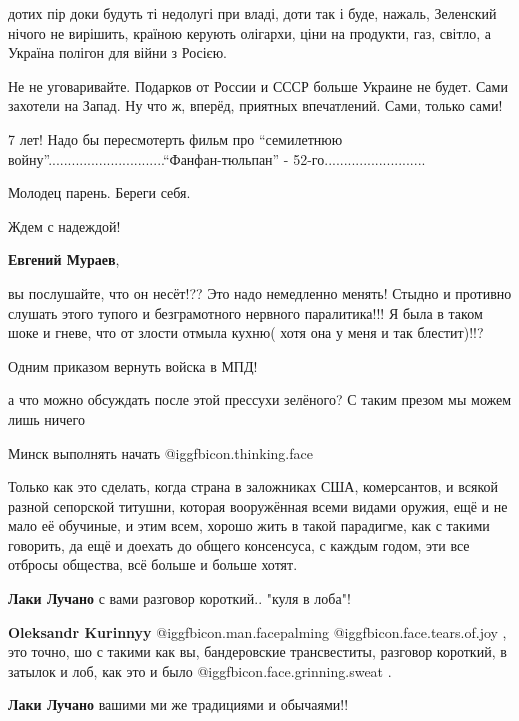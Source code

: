 \begin{itemize}
дотих пір доки будуть ті недолугі при владі, доти так і буде, нажаль, Зеленский
нічого не вирішить, країною керують олігархи, ціни на продукти, газ, світло, а
Україна полігон для війни з Росією.


Не не уговаривайте. Подарков от России и СССР больше Украине не будет. Сами
захотели на Запад. Ну что ж, вперёд, приятных впечатлений. Сами, только сами!


7 лет! Надо бы пересмотерть фильм про \enquote{семилетнюю
войну}..............................\enquote{Фанфан-тюльпан} -
52-го..........................

Молодец парень. Береги себя.

Ждем с надеждой!

\textbf{Евгений Мураев}, 

вы послушайте, что он несёт!?? Это надо немедленно менять! Стыдно и противно
слушать этого тупого и безграмотного нервного паралитика!!! Я была в таком шоке
и гневе, что от злости отмыла кухню( хотя она у меня и так блестит)!!?

Одним приказом вернуть войска в МПД!

а что можно обсуждать после этой прессухи зелёного? С таким презом мы можем лишь ничего

Минск выполнять начать @igg{fbicon.thinking.face} 


Только как это сделать, когда страна в заложниках США, комерсантов, и всякой
разной сепорской титушни, которая вооружённая всеми видами оружия, ещё и не
мало её обучиные, и этим всем, хорошо жить в такой парадигме, как с такими
говорить, да ещё и доехать до общего консенсуса, с каждым годом, эти все
отбросы общества, всё больше и больше хотят.

\begin{itemize} %
\textbf{Лаки Лучано} с вами разговор короткий.. "куля в лоба"!

\textbf{Oleksandr Kurinnyy}  @igg{fbicon.man.facepalming}  @igg{fbicon.face.tears.of.joy} , это точно, шо с такими как вы, бандеровские трансвеститы, разговор короткий, в затылок и лоб, как это и было  @igg{fbicon.face.grinning.sweat} .

\textbf{Лаки Лучано} вашими ми же традициями и обычаями!!


\end{itemize}
\end{itemize}
